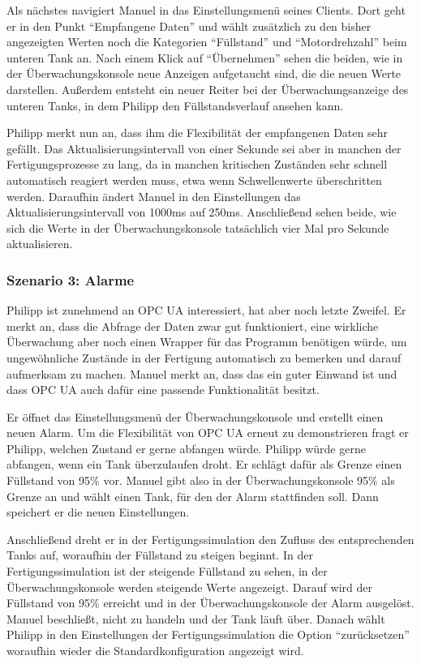 \documentclass[parskip=full]{scrartcl}
\begin{document}
Als nächstes navigiert Manuel in das Einstellungsmenü seines Clients. Dort geht er in den Punkt ``Empfangene Daten'' und
wählt zusätzlich zu den bisher angezeigten Werten noch die Kategorien ``Füllstand'' und ``Motordrehzahl'' beim unteren Tank
an. Nach einem Klick auf ``Übernehmen'' sehen die beiden, wie in der Überwachungskonsole neue Anzeigen aufgetaucht sind,
die die neuen Werte darstellen. Außerdem entsteht ein neuer Reiter bei der Überwachungsanzeige des unteren Tanks,
in dem Philipp den Füllstandsverlauf ansehen kann.

Philipp merkt nun an, dass ihm die Flexibilität der empfangenen Daten sehr gefällt. Das Aktualisierungsintervall von
einer Sekunde sei aber in manchen der Fertigungsprozesse zu lang, da in manchen kritischen Zuständen sehr schnell
automatisch reagiert werden muss, etwa wenn Schwellenwerte überschritten werden. Daraufhin ändert Manuel in den
Einstellungen das Aktualisierungsintervall von 1000ms auf 250ms. Anschließend sehen beide, wie sich die Werte in der
Überwachungskonsole tatsächlich vier Mal pro Sekunde aktualisieren.

\subsubsection{Szenario 3: Alarme}
Philipp ist zunehmend an OPC UA interessiert, hat aber noch letzte Zweifel. Er merkt an, dass die Abfrage der Daten
zwar gut funktioniert, eine wirkliche \"Uberwachung aber noch einen Wrapper f\"ur das Programm ben\"otigen w\"urde,
um ungew\"ohnliche Zust\"ande in der Fertigung automatisch zu bemerken und darauf aufmerksam zu machen.
Manuel merkt an, dass das ein guter Einwand ist und dass OPC UA auch daf\"ur eine passende Funktionalit\"at besitzt.

Er \"offnet das Einstellungsmen\"u der \"Uberwachungskonsole und erstellt einen neuen Alarm. Um die Flexibilit\"at
von OPC UA erneut zu demonstrieren fragt er Philipp, welchen Zustand er gerne abfangen w\"urde. Philipp w\"urde gerne
abfangen, wenn ein Tank \"uberzulaufen droht. Er schl\"agt daf\"ur als Grenze einen F\"ullstand von 95\% vor.
Manuel gibt also in der \"Uberwachungskonsole 95\% als Grenze an und w\"ahlt einen Tank, f\"ur den der Alarm stattfinden soll.
Dann speichert er die neuen Einstellungen.

Anschlie{\ss}end dreht er in der Fertigungssimulation den Zufluss des entsprechenden Tanks auf, woraufhin der F\"ullstand
zu steigen beginnt. In der Fertigungssimulation ist der steigende F\"ullstand zu sehen, in der \"Uberwachungskonsole werden
steigende Werte angezeigt.
Darauf wird der F\"ullstand von 95\% erreicht und in der \"Uberwachungskonsole der Alarm ausgel\"ost. Manuel
beschlie{\ss}t, nicht zu handeln und der Tank l\"auft \"uber. Danach w\"ahlt Philipp in den Einstellungen der
Fertigungssimulation die Option ``zur\"ucksetzen'' woraufhin wieder die Standardkonfiguration angezeigt wird.
\end{document}
